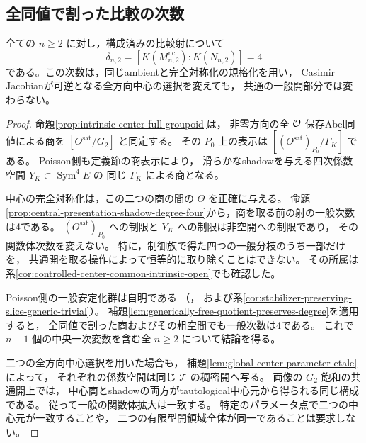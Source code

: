 \subsection{全同値で割った比較の次数}

\begin{theorem}[次数2のPoisson比較は一般に四価である]
\label{thm:degree-two-shadow-degree-four}
全ての $n\ge2$ に対し，構成済みの比較射について
\[
 \delta_{n,2}
   =[K(M^{\mathrm{nc}}_{n,2}):K(N_{n,2})]=4
\]
である。この次数は，同じambientと完全対称化の規格化を用い，
Casimir Jacobianが可逆となる全方向中心の選択を変えても，
共通の一般開部分では変わらない。
\end{theorem}
\begin{proof}
命題\ref{prop:intrinsic-center-full-groupoid}は，
非零方向の全 $\mathcal O$ 保存Abel同値による商を
$[O^{\mathrm{sat}}/G_2]$ と同定する。
その $P_0$ 上の表示は $[(O^{\mathrm{sat}})_{P_0}/\Gamma_K]$ である。
Poisson側も定義節の商表示により，
滑らかなshadowを与える四次係数空間 $Y_K\subset\operatorname{Sym}^4E$ の
同じ $\Gamma_K$ による商となる。

中心の完全対称化は，この二つの商の間の $\Theta$ を正確に与える。
命題\ref{prop:central-presentation-shadow-degree-four}から，商を取る前の射の一般次数は4である。
$(O^{\mathrm{sat}})_{P_0}$ への制限と $Y_K$ への制限は非空開への制限であり，
その関数体次数を変えない。
特に，制御族で得た四つの一般分枝のうち一部だけを，
共通開を取る操作によって恒等的に取り除くことはできない。
その所属は系\ref{cor:controlled-center-common-intrinsic-open}でも確認した。

Poisson側の一般安定化群は自明である
（\cite[命題9.4--9.5]{PoissonDP}，
および系\ref{cor:stabilizer-preserving-slice-generic-trivial}）。
補題\ref{lem:generically-free-quotient-preserves-degree}を適用すると，
全同値で割った商およびその粗空間でも一般次数は4である。
これで $n-1$ 個の中央一次変数を含む全 $n\ge2$ について結論を得る。

二つの全方向中心選択を用いた場合も，
補題\ref{lem:global-center-parameter-etale}によって，
それぞれの係数空間は同じ $\mathcal T$ の稠密開へ写る。
両像の $G_2$ 飽和の共通開上では，
中心商とshadowの両方がtautological中心元から得られる同じ構成である。
従って一般の関数体拡大は一致する。
特定のパラメータ点で二つの中心元が一致することや，
二つの有限型開領域全体が同一であることは要求しない。
\end{proof}

